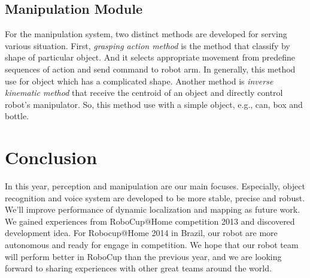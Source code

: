 \documentclass{llncs}
\begin{document}
\subsection{Manipulation Module}

For the manipulation system, two distinct methods are developed for serving various situation. First, \textit{grasping action method} is the method that classify by shape of particular object. And it selects appropriate movement from predefine sequences of action and send command to robot arm. In generally, this method use for object which has a complicated shape. Another method is \textit{inverse kinematic method} that receive the centroid of an object and directly control robot's manipulator. So, this method use with a simple object, e.g., can, box and bottle.

\section{Conclusion}

In this year, perception and manipulation are our main focuses. Especially, object recognition and voice system are developed to be more stable, precise and robust. We'll improve performance of dynamic localization and mapping as future work. We gained experiences from RoboCup@Home competition 2013 and discovered development idea. For Robocup@Home 2014 in Brazil, our robot are more autonomous and ready for engage in competition. We hope that our robot team will perform better in RoboCup than the previous year, and we are looking forward to sharing experiences with other great teams around the world.
\end{document}
